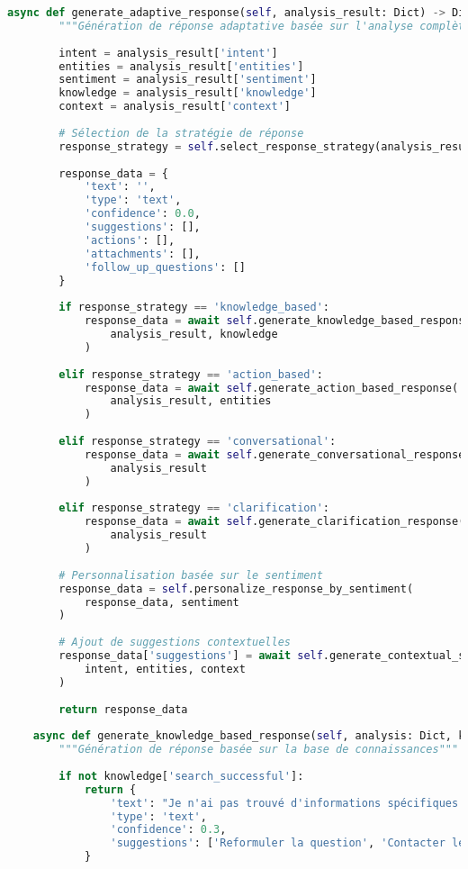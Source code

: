 \documentclass[12pt,a4paper]{report}
\begin{document}
\begin{lstlisting}[language=Python, caption=Pipeline NLP avancé pour le chatbot]
    async def generate_adaptive_response(self, analysis_result: Dict) -> Dict:
        """Génération de réponse adaptative basée sur l'analyse complète"""
        
        intent = analysis_result['intent']
        entities = analysis_result['entities']
        sentiment = analysis_result['sentiment']
        knowledge = analysis_result['knowledge']
        context = analysis_result['context']
        
        # Sélection de la stratégie de réponse
        response_strategy = self.select_response_strategy(analysis_result)
        
        response_data = {
            'text': '',
            'type': 'text',
            'confidence': 0.0,
            'suggestions': [],
            'actions': [],
            'attachments': [],
            'follow_up_questions': []
        }
        
        if response_strategy == 'knowledge_based':
            response_data = await self.generate_knowledge_based_response(
                analysis_result, knowledge
            )
        
        elif response_strategy == 'action_based':
            response_data = await self.generate_action_based_response(
                analysis_result, entities
            )
        
        elif response_strategy == 'conversational':
            response_data = await self.generate_conversational_response(
                analysis_result
            )
        
        elif response_strategy == 'clarification':
            response_data = await self.generate_clarification_response(
                analysis_result
            )
        
        # Personnalisation basée sur le sentiment
        response_data = self.personalize_response_by_sentiment(
            response_data, sentiment
        )
        
        # Ajout de suggestions contextuelles
        response_data['suggestions'] = await self.generate_contextual_suggestions(
            intent, entities, context
        )
        
        return response_data
    
    async def generate_knowledge_based_response(self, analysis: Dict, knowledge: Dict) -> Dict:
        """Génération de réponse basée sur la base de connaissances"""
        
        if not knowledge['search_successful']:
            return {
                'text': "Je n'ai pas trouvé d'informations spécifiques sur votre demande. Pouvez-vous être plus précis ?",
                'type': 'text',
                'confidence': 0.3,
                'suggestions': ['Reformuler la question', 'Contacter le support', 'Consulter la documentation']
            }
        

\end{lstlisting}
\end{document}
